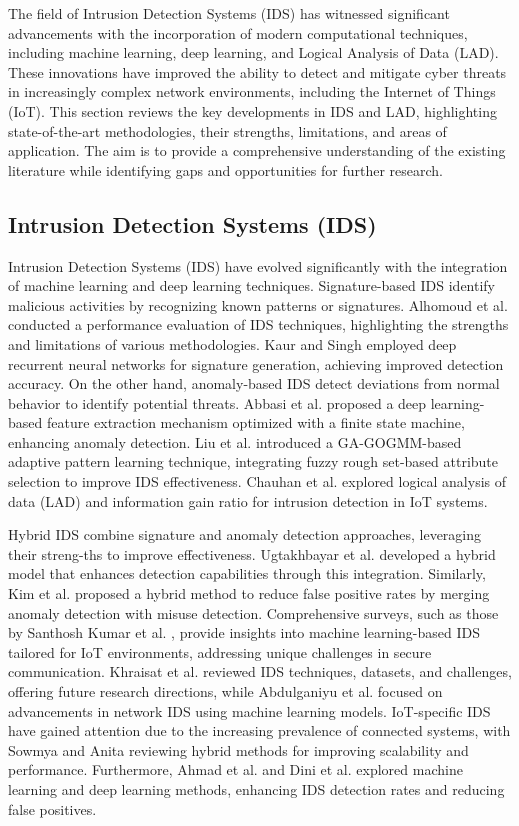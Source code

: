 \documentclass[pdflatex,sn-mathphys-num]{sn-jnl}%
\theoremstyle{thmstyleone}%
\theoremstyle{thmstyletwo}%
\theoremstyle{thmstylethree}%
\begin{document}
The field of Intrusion Detection Systems (IDS) has witnessed significant advancements with the incorporation of modern computational techniques, including machine learning, deep learning, and Logical Analysis of Data (LAD). These innovations have improved the ability to detect and mitigate cyber threats in increasingly complex network environments, including the Internet of Things (IoT). This section reviews the key developments in IDS and LAD, highlighting state-of-the-art methodologies, their strengths, limitations, and areas of application. The aim is to provide a comprehensive understanding of the existing literature while identifying gaps and opportunities for further research. 

\subsection{Intrusion Detection Systems (IDS)}  
Intrusion Detection Systems (IDS) have evolved significantly with the integration of machine learning and deep learning techniques. Signature-based IDS identify malicious activities by recognizing known patterns or signatures. Alhomoud et al. \cite{IDS4} conducted a performance evaluation of IDS techniques, highlighting the strengths and limitations of various methodologies. Kaur and Singh \cite{IDS14} employed deep recurrent neural networks for signature generation, achieving improved detection accuracy. On the other hand, anomaly-based IDS detect deviations from normal behavior to identify potential threats. Abbasi et al. \cite{IDS1} proposed a deep learning-based feature extraction mechanism optimized with a finite state machine, enhancing anomaly detection. Liu et al. \cite{IDS3} introduced a GA-GOGMM-based adaptive pattern learning technique, integrating fuzzy rough set-based attribute selection to improve IDS effectiveness. Chauhan et al. \cite{IDS15} explored logical analysis of data (LAD) and information gain ratio for intrusion detection in IoT systems. 

Hybrid IDS combine signature and anomaly detection approaches, leveraging their streng-ths to improve effectiveness. Ugtakhbayar et al. \cite{IDS6} developed a hybrid model that enhances detection capabilities through this integration. Similarly, Kim et al. \cite{IDS8} proposed a hybrid method to reduce false positive rates by merging anomaly detection with misuse detection. Comprehensive surveys, such as those by Santhosh Kumar et al. \cite{IDS2}, provide insights into machine learning-based IDS tailored for IoT environments, addressing unique challenges in secure communication. Khraisat et al. \cite{IDS19} reviewed IDS techniques, datasets, and challenges, offering future research directions, while Abdulganiyu et al. \cite{IDS9} focused on advancements in network IDS using machine learning models. IoT-specific IDS have gained attention due to the increasing prevalence of connected systems, with Sowmya and Anita \cite{IDS5} reviewing hybrid methods for improving scalability and performance. Furthermore, Ahmad et al. \cite{IDS16} and Dini et al. \cite{IDS17} explored machine learning and deep learning methods, enhancing IDS detection rates and reducing false positives.
\end{document}
